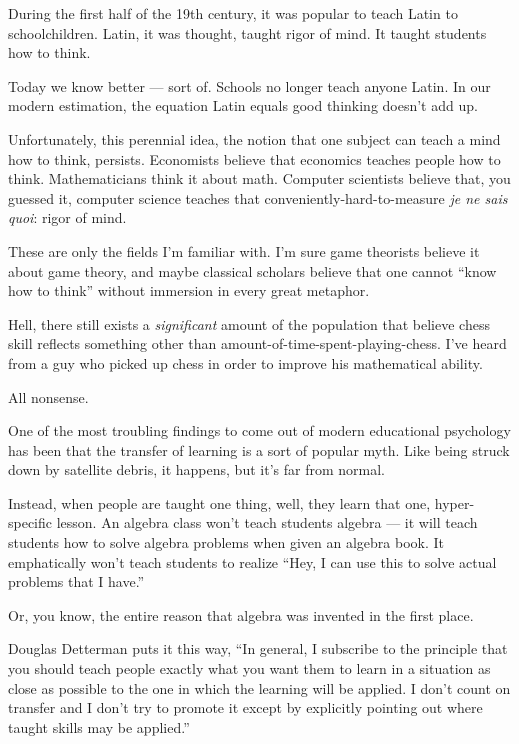 During the first half of the 19th century, it was popular to teach Latin to
schoolchildren. Latin, it was thought, taught rigor of mind. It taught
students how to think.

Today we know better --- sort of. Schools no longer teach anyone Latin. In our
modern estimation, the equation Latin equals good thinking doesn't add up. 

Unfortunately, this perennial idea, the notion that one subject can teach a mind
how to think, persists. Economists believe that economics teaches people how to
think. Mathematicians think it about math. Computer scientists believe that, you
guessed it, computer science teaches that conveniently-hard-to-measure
\textit{je ne sais quoi}: rigor of mind.

These are only the fields I'm familiar with. I'm sure game theorists believe it
about game theory, and maybe classical scholars believe that one cannot ``know
how to think'' without immersion in every great metaphor.

Hell, there still exists a \textit{significant} amount of the population that
believe chess skill reflects something other than
amount-of-time-spent-playing-chess. I've heard from a guy who picked up chess in
order to improve his mathematical ability.

All nonsense.

One of the most troubling findings to come out of modern educational psychology has been that the transfer of learning is a sort
of popular myth. Like being struck down by satellite debris, it happens, but it's far from normal.

Instead, when people are taught one thing, well, they learn that one,
hyper-specific lesson. An algebra class won't teach students algebra --- it will
teach students how to solve algebra problems when given an algebra book. It
emphatically won't teach students to realize ``Hey, I can use this to solve
actual problems that I have.''

Or, you know, the entire reason that algebra was invented in the first place.

Douglas Detterman puts it this way, ``In general, I subscribe to the principle
that you should teach people exactly what you want them to learn in a situation
as close as possible to the one in which the learning will be applied.  I don't
count on transfer and I don't try to promote it except by explicitly pointing
out where taught skills may be applied.''

